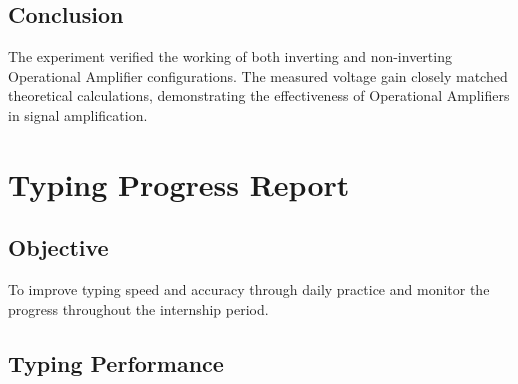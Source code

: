 \documentclass[12pt,a4paper]{report}
\begin{document}
\section{Conclusion}

The experiment verified the working of both inverting and non-inverting Operational Amplifier configurations. The measured voltage gain closely matched theoretical calculations, demonstrating the effectiveness of Operational Amplifiers in signal amplification.

\newpage




\chapter{Typing Progress Report}

\section{Objective}

To improve typing speed and accuracy through daily practice and monitor the progress throughout the internship period.

\section{Typing Performance}
\end{document}
